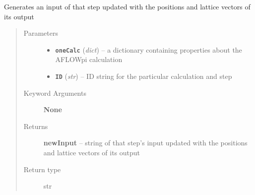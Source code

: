 \documentclass[letterpaper,10pt,english]{sphinxmanual}
\begin{document}
\begin{fulllineitems}
\label{retr:retr.__writeInputFromOutputString}
Generates an input of that step updated with the positions and lattice vectors of its output
\begin{quote}\begin{description}
\item[{Parameters}] \leavevmode\begin{itemize}
\item {} 
\textbf{\texttt{oneCalc}} (\emph{dict}) -- a dictionary containing properties about the AFLOWpi calculation

\item {} 
\textbf{\texttt{ID}} (\emph{str}) -- ID string for the particular calculation and step

\end{itemize}

\item[{Keyword Arguments}] \leavevmode
\textbf{None}

\item[{Returns}] \leavevmode
\textbf{newInput} --
string of that step's input updated with the positions and lattice vectors of its output

\item[{Return type}] \leavevmode
str

\end{description}\end{quote}

\end{fulllineitems}

\end{document}
